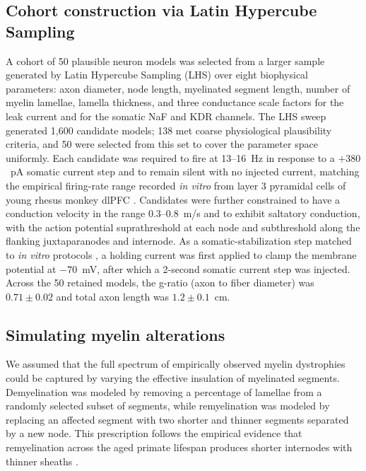 \documentclass[11pt]{article}
\begin{document}
\subsection{Cohort construction via Latin Hypercube Sampling}

A cohort of 50 plausible neuron models was selected from a larger sample generated by Latin Hypercube Sampling (LHS) over eight biophysical parameters: axon diameter, node length, myelinated segment length, number of myelin lamellae, lamella thickness, and three conductance scale factors for the leak current and for the somatic NaF and KDR channels. The LHS sweep generated 1{,}600 candidate models; 138 met coarse physiological plausibility criteria, and 50 were selected from this set to cover the parameter space uniformly. Each candidate was required to fire at 13--16~Hz in response to a $+380$~pA somatic current step and to remain silent with no injected current, matching the empirical firing-rate range recorded \emph{in vitro} from layer 3 pyramidal cells of young rhesus monkey dlPFC \citep{chang2005firing,ibanez2020network}. Candidates were further constrained to have a conduction velocity in the range 0.3--0.8~m/s and to exhibit saltatory conduction, with the action potential suprathreshold at each node and subthreshold along the flanking juxtaparanodes and internode. As a somatic-stabilization step matched to \emph{in vitro} protocols \citep{chang2005firing,coskren2015aging,ibanez2020network,rumbell2016automated}, a holding current was first applied to clamp the membrane potential at $-70$~mV, after which a 2-second somatic current step was injected. Across the 50 retained models, the g-ratio (axon to fiber diameter) was $0.71 \pm 0.02$ and total axon length was $1.2 \pm 0.1$~cm.

\subsection{Simulating myelin alterations}

We assumed that the full spectrum of empirically observed myelin dystrophies \citep{peters2002aging} could be captured by varying the effective insulation of myelinated segments. Demyelination was modeled by removing a percentage of lamellae from a randomly selected subset of segments, while remyelination was modeled by replacing an affected segment with two shorter and thinner segments separated by a new node. This prescription follows the empirical evidence that remyelination across the aged primate lifespan produces shorter internodes with thinner sheaths \citep{peters2003remyelination,bowley2010cingulate}.
\end{document}
